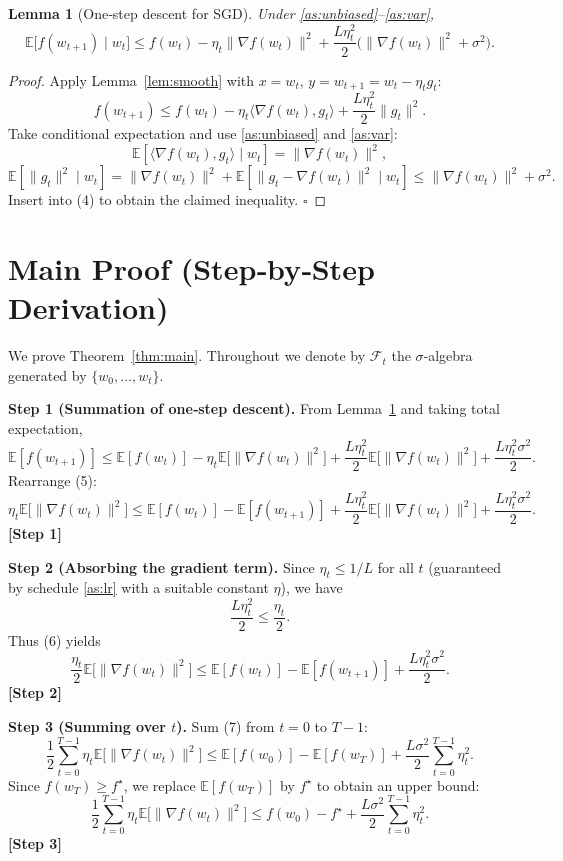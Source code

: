 \documentclass{article}
\newtheorem{lemma}{Lemma}
\newcommand{\E}{\mathbb{E}}
\begin{document}
\begin{lemma}[One‑step descent for SGD]\label{lem:sgd}
Under \ref{as:unbiased}–\ref{as:var},
\[
\E\big[f(w_{t+1})\mid w_t\big]
\le f(w_t)-\eta_t\|\nabla f(w_t)\|^2+\frac{L\eta_t^2}{2}\big(\|\nabla f(w_t)\|^2+\sigma^2\big).
\]
\end{lemma}
\begin{proof}
Apply Lemma~\ref{lem:smooth} with $x=w_t$, $y=w_{t+1}=w_t-\eta_t g_t$:
\[
f(w_{t+1})\le f(w_t)-\eta_t\langle\nabla f(w_t),g_t\rangle+\frac{L\eta_t^2}{2}\|g_t\|^2 .
\tag{4}
\]
Take conditional expectation and use \ref{as:unbiased} and \ref{as:var}:
\[
\E[\langle\nabla f(w_t),g_t\rangle\mid w_t]=\|\nabla f(w_t)\|^2,
\]
\[
\E[\|g_t\|^2\mid w_t]=\|\nabla f(w_t)\|^2+\E[\|g_t-\nabla f(w_t)\|^2\mid w_t]\le\|\nabla f(w_t)\|^2+\sigma^2 .
\]
Insert into (4) to obtain the claimed inequality. \hfill $\square$
\end{proof}

\section*{Main Proof (Step‑by‑Step Derivation)}
We prove Theorem~\ref{thm:main}. Throughout we denote by $\mathcal{F}_t$ the $\sigma$‑algebra generated by $\{w_0,\dots,w_t\}$.

\noindent\textbf{Step 1 (Summation of one‑step descent).}  
From Lemma~\ref{lem:sgd} and taking total expectation,
\[
\E[f(w_{t+1})]\le \E[f(w_t)]-\eta_t\E\!\big[\|\nabla f(w_t)\|^2\big]
       +\frac{L\eta_t^2}{2}\E\!\big[\|\nabla f(w_t)\|^2\big]
       +\frac{L\eta_t^2\sigma^2}{2}.
\tag{5}
\]
Rearrange (5):
\[
\eta_t\E\!\big[\|\nabla f(w_t)\|^2\big]
\le \E[f(w_t)]-\E[f(w_{t+1})]
    +\frac{L\eta_t^2}{2}\E\!\big[\|\nabla f(w_t)\|^2\big]
    +\frac{L\eta_t^2\sigma^2}{2}.
\tag{6}
\]
\textbf{[Step 1]}

\noindent\textbf{Step 2 (Absorbing the gradient term).}  
Since $\eta_t\le 1/L$ for all $t$ (guaranteed by schedule \ref{as:lr} with a suitable constant $\eta$), we have
\[
\frac{L\eta_t^2}{2}\le \frac{\eta_t}{2}.
\]
Thus (6) yields
\[
\frac{\eta_t}{2}\E\!\big[\|\nabla f(w_t)\|^2\big]
\le \E[f(w_t)]-\E[f(w_{t+1})]+\frac{L\eta_t^2\sigma^2}{2}.
\tag{7}
\]
\textbf{[Step 2]}

\noindent\textbf{Step 3 (Summing over $t$).}  
Sum (7) from $t=0$ to $T-1$:
\[
\frac12\sum_{t=0}^{T-1}\eta_t\E\!\big[\|\nabla f(w_t)\|^2\big]
\le \E[f(w_0)]-\E[f(w_T)]+\frac{L\sigma^2}{2}\sum_{t=0}^{T-1}\eta_t^2 .
\tag{8}
\]
Since $f(w_T)\ge f^\star$, we replace $\E[f(w_T)]$ by $f^\star$ to obtain an upper bound:
\[
\frac12\sum_{t=0}^{T-1}\eta_t\E\!\big[\|\nabla f(w_t)\|^2\big]
\le f(w_0)-f^\star+\frac{L\sigma^2}{2}\sum_{t=0}^{T-1}\eta_t^2 .
\tag{9}
\]
\textbf{[Step 3]}
\end{document}
